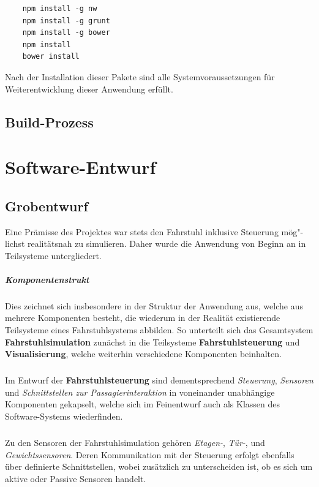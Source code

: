 \begin{lstlisting}
	npm install -g nw
	npm install -g grunt
	npm install -g bower
	npm install
	bower install
\end{lstlisting}

Nach der Installation dieser Pakete sind alle Systemvoraussetzungen für Weiterentwicklung dieser Anwendung erfüllt. 

\section{Build-Prozess}

\chapter{Software-Entwurf}
\section{Grobentwurf}
Eine Prämisse des Projektes war stets den Fahrstuhl inklusive Steuerung mög"-lichst realitätsnah zu simulieren. Daher wurde die Anwendung von Beginn an in Teilsysteme untergliedert.

\paragraph{Komponentenstrukt}Dies zeichnet sich insbesondere in der Struktur der Anwendung aus, welche aus mehrere Komponenten besteht, die wiederum in der Realität existierende Teilsysteme eines Fahrstuhlsystems abbilden. So unterteilt sich das Gesamtsystem \textbf{Fahrstuhlsimulation} zunächst in die Teilsysteme \textbf{Fahrstuhlsteuerung} und \textbf{Visualisierung}, welche weiterhin verschiedene Komponenten beinhalten.

\paragraph{}Im Entwurf der \textbf{Fahrstuhlsteuerung} sind dementsprechend \textit{Steuerung}, \textit{Sensoren} und \textit{Schnittstellen zur Passagierinteraktion} in voneinander unabhängige Komponenten gekapselt, welche sich im Feinentwurf auch als Klassen des Software-Systems wiederfinden.

\paragraph{}Zu den Sensoren der Fahrstuhlsimulation gehören \textit{Etagen-}, \textit{Tür-}, und \textit{Gewichtssensoren}. Deren Kommunikation mit der Steuerung erfolgt ebenfalls über definierte Schnittstellen, wobei zusätzlich zu unterscheiden ist, ob es sich um aktive oder Passive Sensoren handelt.

